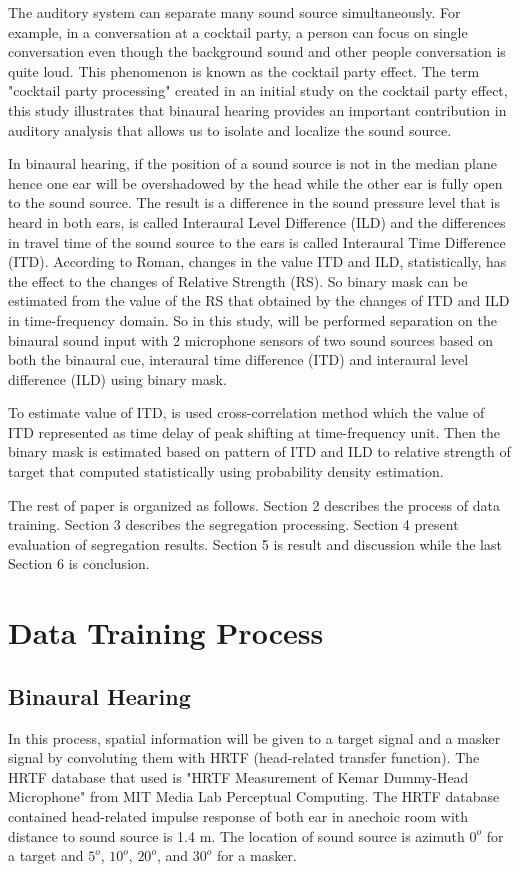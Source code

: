 \documentclass[a4paper]{jpconf}
\begin{document}
The auditory system can separate many sound source simultaneously. For example, in a conversation at a cocktail party, a person can focus on single conversation even though the background sound and other people conversation is quite loud. This phenomenon is known as the cocktail party effect\cite{cherry1957}. The term "cocktail party processing" created in an initial study on the cocktail party effect, this study illustrates that binaural hearing provides an important contribution in auditory analysis that allows us to isolate and localize the sound source\cite{hawley2004}.


In binaural hearing, if the position of a sound source is not in the median plane hence one ear will be overshadowed by the head while the other ear is fully open to the sound source. The result is a difference in the sound pressure level that is heard in both ears, is called Interaural Level Difference (ILD) and the differences in travel time of the sound source to the ears is called Interaural Time Difference (ITD). According to Roman\cite{roman2002}, changes in the value ITD and ILD, statistically, has the effect to the changes of Relative Strength (RS). So binary mask can be estimated from the value of the RS that obtained by the changes ​​of ITD and ILD in time-frequency domain. So in this study, will be performed separation on the binaural sound input with 2 microphone sensors of two sound sources based on both the binaural cue, interaural time difference (ITD) and interaural level difference (ILD) using binary mask.


To estimate value of ITD, is used cross-correlation method which the value of ITD represented as time delay of peak shifting at time-frequency unit. Then the binary mask is estimated based on pattern of ITD and ILD to relative strength of target that computed statistically using probability density estimation.

The rest of paper is organized as follows. Section 2 describes the process of data training. Section 3 describes the segregation processing. Section 4 present evaluation of segregation results. Section 5 is result and discussion while the last Section 6 is conclusion.

\section{Data Training Process}
\subsection{Binaural Hearing}
In this process, spatial information will be given to a target signal and a masker signal by convoluting them with HRTF (head-related transfer function). The HRTF database that used is "HRTF Measurement of Kemar Dummy-Head Microphone" from MIT Media Lab Perceptual Computing. The HRTF database contained head-related impulse response of both ear in anechoic room with distance to sound source is 1.4 m. The location of sound source is azimuth $0^o$ for a target and $5^o$, $10^o$, $20^o$, and $30^o$ for a masker.
\end{document}
